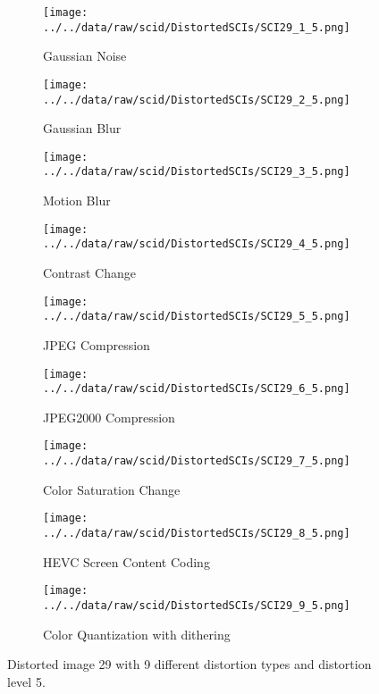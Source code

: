 \begin{figure}[h]
    \centering
    \begin{subfigure}[b]{0.3\textwidth}
        \texttt{[image: ../../data/raw/scid/DistortedSCIs/SCI29\_1\_5.png]}
        \caption{Gaussian Noise}
        \label{fig:distortion_type_1}
    \end{subfigure}
    \hfill
    \begin{subfigure}[b]{0.3\textwidth}
        \texttt{[image: ../../data/raw/scid/DistortedSCIs/SCI29\_2\_5.png]}
        \caption{Gaussian Blur}
        \label{fig:distortion_type_2}
    \end{subfigure}
    \hfill
    \begin{subfigure}[b]{0.3\textwidth}
        \texttt{[image: ../../data/raw/scid/DistortedSCIs/SCI29\_3\_5.png]}
        \caption{Motion Blur}
        \label{fig:distortion_type_3}
    \end{subfigure}
    \newline
    \begin{subfigure}[b]{0.3\textwidth}
        \texttt{[image: ../../data/raw/scid/DistortedSCIs/SCI29\_4\_5.png]}
        \caption{Contrast Change}
        \label{fig:distortion_type_4}
    \end{subfigure}
    \hfill
    \begin{subfigure}[b]{0.3\textwidth}
        \texttt{[image: ../../data/raw/scid/DistortedSCIs/SCI29\_5\_5.png]}
        \caption{JPEG Compression}
        \label{fig:distortion_type_5}
    \end{subfigure}
    \hfill
    \begin{subfigure}[b]{0.3\textwidth}
        \texttt{[image: ../../data/raw/scid/DistortedSCIs/SCI29\_6\_5.png]}
        \caption{JPEG2000 Compression}
        \label{fig:distortion_type_6}
    \end{subfigure}
    \newline
    \begin{subfigure}[b]{0.3\textwidth}
        \texttt{[image: ../../data/raw/scid/DistortedSCIs/SCI29\_7\_5.png]}
        \caption{Color Saturation Change}
        \label{fig:distortion_type_7}
    \end{subfigure}
    \hfill
    \begin{subfigure}[b]{0.3\textwidth}
        \texttt{[image: ../../data/raw/scid/DistortedSCIs/SCI29\_8\_5.png]}
        \caption{HEVC Screen Content Coding}
        \label{fig:distortion_type_8}
    \end{subfigure}
    \hfill
    \begin{subfigure}[b]{0.3\textwidth}
        \texttt{[image: ../../data/raw/scid/DistortedSCIs/SCI29\_9\_5.png]}
        \caption{Color Quantization with dithering}
        \label{fig:distortion_type_9}
    \end{subfigure}
    \caption{Distorted image 29 with 9 different distortion types and distortion level 5.}
    \label{fig:distortion_types}
\end{figure}

